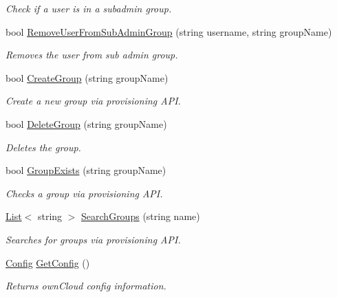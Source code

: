 \begin{DoxyCompactItemize}
\begin{DoxyCompactList}\small\item\em Check if a user is in a subadmin group. \end{DoxyCompactList}\item 
bool \hyperlink{classowncloudsharp_1_1_client_adc52bbdd5e176151e3ba3c51184872dc}{Remove\+User\+From\+Sub\+Admin\+Group} (string username, string group\+Name)
\begin{DoxyCompactList}\small\item\em Removes the user from sub admin group. \end{DoxyCompactList}\item 
bool \hyperlink{classowncloudsharp_1_1_client_ae3f6b18765fa47eed193eae4db94ae2c}{Create\+Group} (string group\+Name)
\begin{DoxyCompactList}\small\item\em Create a new group via provisioning A\+PI. \end{DoxyCompactList}\item 
bool \hyperlink{classowncloudsharp_1_1_client_a83390a9710020ecc7513dd03a23e192f}{Delete\+Group} (string group\+Name)
\begin{DoxyCompactList}\small\item\em Deletes the group. \end{DoxyCompactList}\item 
bool \hyperlink{classowncloudsharp_1_1_client_a0eb9c35f345906e16175605b0cc08ade}{Group\+Exists} (string group\+Name)
\begin{DoxyCompactList}\small\item\em Checks a group via provisioning A\+PI. \end{DoxyCompactList}\item 
\hyperlink{classowncloudsharp_1_1_client_a914c144ebbe207958829523f7eda3609}{List}$<$ string $>$ \hyperlink{classowncloudsharp_1_1_client_af303c729824dbe2ab788273f58f0804a}{Search\+Groups} (string name)
\begin{DoxyCompactList}\small\item\em Searches for groups via provisioning A\+PI. \end{DoxyCompactList}\item 
\hyperlink{classowncloudsharp_1_1_types_1_1_config}{Config} \hyperlink{classowncloudsharp_1_1_client_a6c228561d4c74c310b898ad8bd60095b}{Get\+Config} ()
\begin{DoxyCompactList}\small\item\em Returns own\+Cloud config information. \end{DoxyCompactList}\item 

\end{DoxyCompactItemize}
